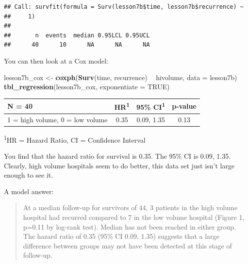 \documentclass[]{book}
\newenvironment{Shaded}{\begin{snugshade}}{\end{snugshade}}
\newcommand{\DataTypeTok}[1]{\textcolor[rgb]{0.13,0.29,0.53}{#1}}
\newcommand{\DecValTok}[1]{\textcolor[rgb]{0.00,0.00,0.81}{#1}}
\newcommand{\KeywordTok}[1]{\textcolor[rgb]{0.13,0.29,0.53}{\textbf{#1}}}
\newcommand{\NormalTok}[1]{#1}
\newcommand{\OperatorTok}[1]{\textcolor[rgb]{0.81,0.36,0.00}{\textbf{#1}}}
\newcommand{\OtherTok}[1]{\textcolor[rgb]{0.56,0.35,0.01}{#1}}
\newcommand{\StringTok}[1]{\textcolor[rgb]{0.31,0.60,0.02}{#1}}
\begin{document}
\begin{Shaded}
\end{Shaded}

\begin{verbatim}
## Call: survfit(formula = Surv(lesson7b$time, lesson7b$recurrence) ~ 
##     1)
## 
##       n  events  median 0.95LCL 0.95UCL 
##      40      10      NA      NA      NA
\end{verbatim}

You can then look at a Cox model:

\begin{Shaded}
\begin{Highlighting}[]
\NormalTok{lesson7b_cox <-}
\StringTok{  }\KeywordTok{coxph}\NormalTok{(}\KeywordTok{Surv}\NormalTok{(time, recurrence) }\OperatorTok{~}\StringTok{ }\NormalTok{hivolume, }\DataTypeTok{data =}\NormalTok{ lesson7b)}
\KeywordTok{tbl_regression}\NormalTok{(lesson7b_cox, }\DataTypeTok{exponentiate =} \OtherTok{TRUE}\NormalTok{)}
\end{Highlighting}
\end{Shaded}

\captionsetup[table]{labelformat=empty,skip=1pt}
\begin{longtable}{lccc}
\toprule
\textbf{N = 40} & \textbf{HR}\textsuperscript{1} & \textbf{95\% CI}\textsuperscript{1} & \textbf{p-value} \\ 
\midrule
1 = high volume, 0 = low volume & 0.35 & 0.09, 1.35 & 0.13 \\ 
\bottomrule
\end{longtable}
\vspace{-5mm}
\begin{minipage}{\linewidth}
\textsuperscript{1}HR = Hazard Ratio, CI = Confidence Interval \\ 
\end{minipage}

You find that the hazard ratio for survival is 0.35. The 95\% CI is 0.09, 1.35. Clearly, high volume hospitals seem to do better, this data set just isn't large enough to see it.

A model answer:

\begin{quote}
At a median follow-up for survivors of 44, 3 patients in the high volume hospital had recurred compared to 7 in the low volume hospital (Figure 1, p=0.11 by log-rank test). Median has not been reached in either group. The hazard ratio of 0.35 (95\% CI 0.09, 1.35) suggests that a large difference between groups may not have been detected at this stage of follow-up.
\end{quote}
\end{document}

